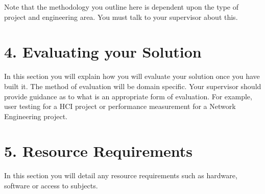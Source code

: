 \documentclass[11pt, a4paper, twoside, openright]{report}
\begin{document}
Note that the methodology you outline here is dependent upon the type
of project and engineering area. You must talk to your supervisor
about this.

\section*{4. Evaluating your Solution}


In this section you will explain how you will evaluate your solution
once you have built it. The method of evaluation will be domain
specific. Your supervisor should provide guidance as to what is an
appropriate form of evaluation. For example, user testing for a HCI
project or performance measurement for a Network Engineering project.

\section*{5. Resource Requirements}


In this section you will detail any resource requirements such as
hardware, software or access to subjects.

\backmatter

%


\end{document}
